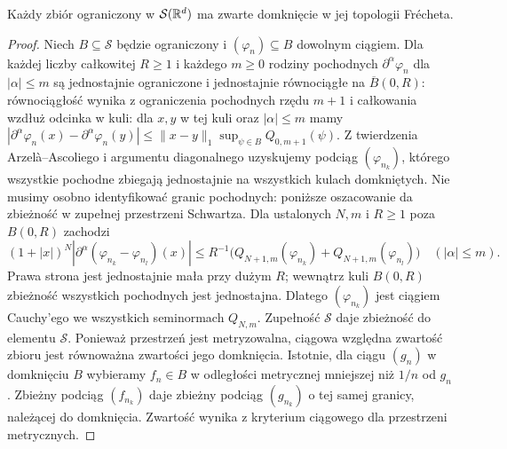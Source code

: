 \begin{lemat}
\label{lem:montel-schwartz22}
Każdy zbiór ograniczony w $\mathcal S(\mathbb R^d)$ ma zwarte
domknięcie w jej topologii Frécheta.
\end{lemat}
\begin{proof}
Niech $B\subseteq\mathcal S$ będzie ograniczony i
$(\varphi_n)\subseteq B$ dowolnym ciągiem.
Dla każdej liczby całkowitej $R\ge1$ i każdego $m\ge0$
rodziny pochodnych $\partial^\alpha\varphi_n$ dla
$|\alpha|\le m$ są jednostajnie ograniczone i
jednostajnie równociągłe na $\overline B(0,R)$:
równociągłość wynika z ograniczenia pochodnych
rzędu $m+1$ i całkowania wzdłuż odcinka w kuli:
dla $x,y$ w tej kuli oraz $|\alpha|\le m$ mamy
$|\partial^\alpha\varphi_n(x)-\partial^\alpha\varphi_n(y)|
\le\|x-y\|_1\sup_{\psi\in B}Q_{0,m+1}(\psi)$. Z twierdzenia Arzelà--Ascoliego
i argumentu diagonalnego uzyskujemy podciąg
$(\varphi_{n_k})$, którego wszystkie pochodne zbiegają
jednostajnie na wszystkich kulach domkniętych.
Nie musimy osobno identyfikować granic pochodnych:
poniższe oszacowanie da zbieżność w zupełnej
przestrzeni Schwartza.
Dla ustalonych $N,m$ i $R\ge1$ poza $B(0,R)$ zachodzi
\[
(1+|x|)^N|\partial^\alpha(\varphi_{n_k}-\varphi_{n_l})(x)|
\le R^{-1}\bigl(Q_{N+1,m}(\varphi_{n_k})
+Q_{N+1,m}(\varphi_{n_l})\bigr)\quad(|\alpha|\le m).
\]
Prawa strona jest jednostajnie mała przy dużym $R$;
wewnątrz kuli $B(0,R)$ zbieżność wszystkich pochodnych
jest jednostajna. Dlatego $(\varphi_{n_k})$ jest ciągiem
Cauchy'ego we wszystkich seminormach $Q_{N,m}$.
Zupełność $\mathcal S$ daje zbieżność do elementu
$\mathcal S$. Ponieważ przestrzeń jest metryzowalna,
ciągowa względna zwartość zbioru jest równoważna
zwartości jego domknięcia. Istotnie, dla ciągu $(g_n)$
w domknięciu $B$ wybieramy $f_n\in B$ w odległości
metrycznej mniejszej niż $1/n$ od $g_n$.
Zbieżny podciąg $(f_{n_k})$ daje zbieżny podciąg
$(g_{n_k})$ o tej samej granicy, należącej do domknięcia.
Zwartość wynika z kryterium ciągowego dla przestrzeni
metrycznych.
\end{proof}

